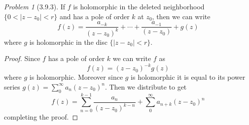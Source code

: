 \documentclass[10pt]{article}
\newcommand{\sk}{\vskip 10mm}
\theoremstyle{remark}
\newtheorem{problem}{Problem}
\theoremstyle{remark}
\begin{document}
\sk

\begin{problem}[3.9.3]
  If $f$ is holomorphic in the deleted neighborhood $\{0<|z-z_0|<r\}$ and has a
  pole of order $k$ at $z_0$, then we can write
  \[
    f\left(z\right)=\frac{a_{-k}}{\left(z-z_0\right)^k}+\cdots + \frac{a_{-1}}{\left(z-z_0\right)} +g\left(z\right)
  \]
  where $g$ is holomorphic in the disc $\{|z-z_0|<r\}$.
\end{problem}

\begin{proof}
  Since $f$ has a pole of order $k$ we can write $f$ as
  \[
    f\left(z\right)=\left(z-z_0\right)^{-k} g\left(z\right)
  \]
  where $g$ is holomorphic. Moreover since $g$ is holomorphic it is equal
  to its power series $g\left(z\right)=\sum_0^\infty a_n\left(z-z_0\right)^n$. Then we distribute to get
  \[
    f\left(z\right)=\sum_{n=0}^{k-1}\frac{a_n}{\left(z-z_0\right)^{k-n}}+\sum_0^\infty a_{n+k}\left(z-z_0\right)^n
  \]
  completing the proof.
\end{proof}

\end{document}
